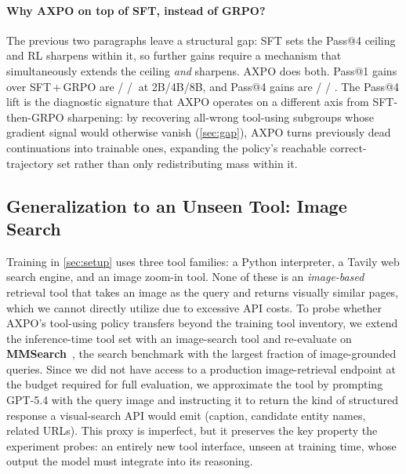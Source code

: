 \paragraph{Why AXPO on top of SFT, instead of GRPO?}
The previous two paragraphs leave a structural gap: SFT sets the Pass@4 ceiling and RL sharpens within it, so further gains require a mechanism that simultaneously extends the ceiling \emph{and} sharpens. AXPO does both. Pass@1 gains over SFT\,+\,GRPO are \dPassOneTwoB / \dPassOneFourB / \dPassOneEightB $\ $at 2B/4B/8B, and Pass@4 gains are \dPassFourTwoB / \dPassFourFourB / \dPassFourEightB. The Pass@4 lift is the diagnostic signature that AXPO operates on a different axis from SFT-then-GRPO sharpening: by recovering all-wrong tool-using subgroups whose gradient signal would otherwise vanish (\autoref{sec:gap}), AXPO turns previously dead continuations into trainable ones, expanding the policy's reachable correct-trajectory set rather than only redistributing mass within it.

\subsection{Generalization to an Unseen Tool: Image Search}
\label{app:image-search-gen}


Training in \autoref{sec:setup} uses three tool families: a Python interpreter, a Tavily web search engine, and an image zoom-in tool. None of these is an \emph{image-based} retrieval tool that takes an image as the query and returns visually similar pages, which we cannot directly utilize due to excessive API costs.
To probe whether AXPO's tool-using policy transfers beyond the training tool inventory, we extend the inference-time tool set with an image-search tool and re-evaluate on \textbf{MMSearch}~\citep{mmsearch}, the search benchmark with the largest fraction of image-grounded queries. Since we did not have access to a production image-retrieval endpoint at the budget required for full evaluation, we approximate the tool by prompting GPT-5.4 with the query image and instructing it to return the kind of structured response a visual-search API would emit (caption, candidate entity names, related URLs). This proxy is imperfect, but it preserves the key property the experiment probes: an entirely new tool interface, unseen at training time, whose output the model must integrate into its reasoning.

